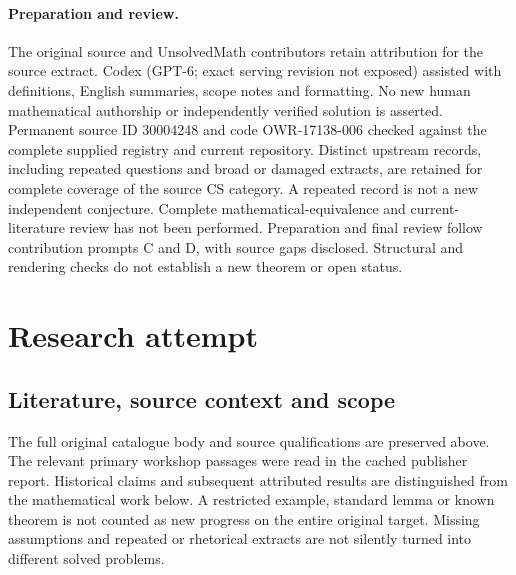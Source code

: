 \documentclass[11pt]{article}
\begin{document}
\paragraph{Preparation and review.}
The original source and UnsolvedMath contributors retain attribution for the source extract. Codex (GPT-6; exact serving revision not exposed) assisted with definitions, English summaries, scope notes and formatting. No new human mathematical authorship or independently verified solution is asserted. Permanent source ID 30004248 and code OWR-17138-006 checked against the complete supplied registry and current repository. Distinct upstream records, including repeated questions and broad or damaged extracts, are retained for complete coverage of the source CS category. A repeated record is not a new independent conjecture. Complete mathematical-equivalence and current-literature review has not been performed. Preparation and final review follow contribution prompts C and D, with source gaps disclosed. Structural and rendering checks do not establish a new theorem or open status.
\label{end:30004248}

\section{Research attempt}
\subsection{Literature, source context and scope}
The full original catalogue body and source qualifications are preserved above. The relevant primary workshop passages were read in the cached publisher report. Historical claims and subsequent attributed results are distinguished from the mathematical work below. A restricted example, standard lemma or known theorem is not counted as new progress on the entire original target. Missing assumptions and repeated or rhetorical extracts are not silently turned into different solved problems.
\end{document}
